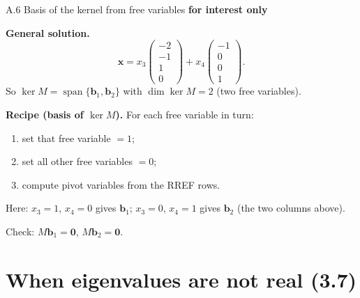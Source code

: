 \documentclass[11pt,aspectratio=169]{beamer}
\newcommand{\InterestOnly}{\textcolor{mAccent}{\textbf{for interest only}}}
\begin{document}
\begin{frame}{A.6 Basis of the kernel from free variables}
  \footnotesize
  \InterestOnly

  \medskip
  \textbf{General solution.}
  \[
    \mathbf{x}
    =x_3\begin{pmatrix}-2\\ -1\\ 1\\ 0\end{pmatrix}
    +x_4\begin{pmatrix}-1\\ 0\\ 0\\ 1\end{pmatrix}.
  \]
  So $\ker M=\operatorname{span}\{\mathbf{b}_1,\mathbf{b}_2\}$ with $\dim\ker M=2$ (two free variables).

  \medskip
  \textbf{Recipe (basis of $\ker M$).} For each free variable in turn:
  \begin{enumerate}
    \item set that free variable $=1$;
    \item set all other free variables $=0$;
    \item compute pivot variables from the RREF rows.
  \end{enumerate}
  Here: $x_3=1$, $x_4=0$ gives $\mathbf{b}_1$;
  $x_3=0$, $x_4=1$ gives $\mathbf{b}_2$ (the two columns above).

  \medskip
  {\scriptsize Check: $M\mathbf{b}_1=\mathbf{0}$, $M\mathbf{b}_2=\mathbf{0}$.}
\end{frame}

\section{When eigenvalues are not real (3.7)}
\end{document}
